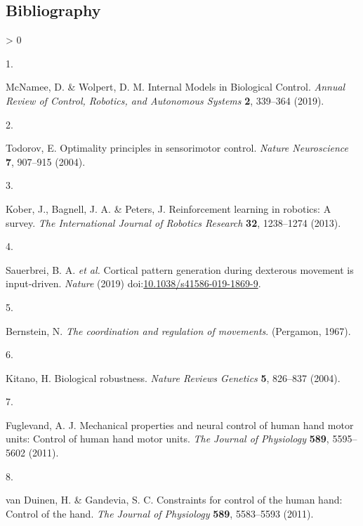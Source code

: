 \documentclass[
  a4paper,
]{article}
\newlength{\cslhangindent}
\newlength{\csllabelwidth}
\newenvironment{CSLReferences}[2] %
 {%
  \setlength{\parindent}{0pt}
  \ifodd #1 \everypar{\setlength{\hangindent}{\cslhangindent}}\ignorespaces\fi
  \ifnum #2 > 0
  \setlength{\parskip}{#2\baselineskip}
  \fi
 }%
 {}
\newcommand{\CSLLeftMargin}[1]{\parbox[t]{\csllabelwidth}{#1}}
\newcommand{\CSLRightInline}[1]{\parbox[t]{\linewidth - \csllabelwidth}{#1}\break}
\begin{document}
\clearpage

\hypertarget{bibliography}{%
\subsection*{Bibliography}\label{bibliography}}

\hypertarget{refs}{}
\begin{CSLReferences}{0}{0}
\leavevmode\hypertarget{ref-McNamee2019}{}%
\CSLLeftMargin{1. }
\CSLRightInline{McNamee, D. \& Wolpert, D. M. Internal {Models} in
{Biological Control}. \emph{Annual Review of Control, Robotics, and
Autonomous Systems} \textbf{2}, 339--364 (2019).}

\leavevmode\hypertarget{ref-Todorov2004}{}%
\CSLLeftMargin{2. }
\CSLRightInline{Todorov, E. Optimality principles in sensorimotor
control. \emph{Nature Neuroscience} \textbf{7}, 907--915 (2004).}

\leavevmode\hypertarget{ref-koberReinforcementLearningRobotics2013}{}%
\CSLLeftMargin{3. }
\CSLRightInline{Kober, J., Bagnell, J. A. \& Peters, J. Reinforcement
learning in robotics: {A} survey. \emph{The International Journal of
Robotics Research} \textbf{32}, 1238--1274 (2013).}

\leavevmode\hypertarget{ref-sauerbreiCorticalPatternGeneration2019}{}%
\CSLLeftMargin{4. }
\CSLRightInline{Sauerbrei, B. A. \emph{et al.} Cortical pattern
generation during dexterous movement is input-driven. \emph{Nature}
(2019)
doi:\href{https://doi.org/10.1038/s41586-019-1869-9}{10.1038/s41586-019-1869-9}.}

\leavevmode\hypertarget{ref-Bernstein1967}{}%
\CSLLeftMargin{5. }
\CSLRightInline{Bernstein, N. \emph{The coordination and regulation of
movements}. ({Pergamon}, 1967).}

\leavevmode\hypertarget{ref-kitanoBiologicalRobustness2004}{}%
\CSLLeftMargin{6. }
\CSLRightInline{Kitano, H. Biological robustness. \emph{Nature Reviews
Genetics} \textbf{5}, 826--837 (2004).}

\leavevmode\hypertarget{ref-fuglevandMechanicalPropertiesNeural2011}{}%
\CSLLeftMargin{7. }
\CSLRightInline{Fuglevand, A. J. Mechanical properties and neural
control of human hand motor units: {Control} of human hand motor units.
\emph{The Journal of Physiology} \textbf{589}, 5595--5602 (2011).}

\leavevmode\hypertarget{ref-vanduinenConstraintsControlHuman2011}{}%
\CSLLeftMargin{8. }
\CSLRightInline{van Duinen, H. \& Gandevia, S. C. Constraints for
control of the human hand: {Control} of the hand. \emph{The Journal of
Physiology} \textbf{589}, 5583--5593 (2011).}


\end{CSLReferences}
\end{document}
